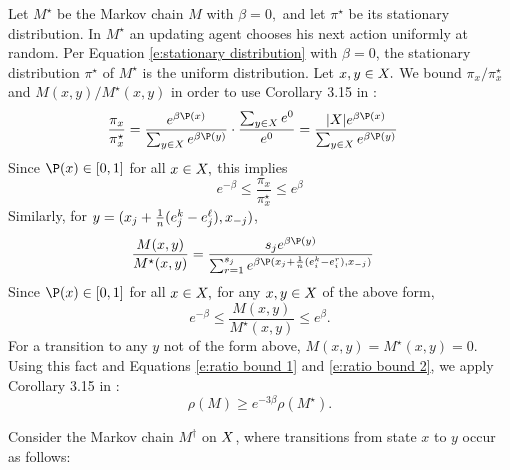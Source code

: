 \noindent{}
Let $M^\star$  be the Markov chain $M$ with $\beta = 0,$ and let $\pi^\star$ be its stationary distribution. In $M^\star$ an updating agent chooses his next action uniformly at random. Per Equation \eqref{e:stationary distribution} with $\beta=0$, the stationary distribution $\pi^\star$ of $M^\star$ is the uniform distribution.
  Let $x,y\in  X.$  We bound $\pi_x/\pi_x^\star$ and $M(x,y)/M^\star(x,y)$ in order to use Corollary 3.15 in \cite{Montenegro2006}:
\begin{align*}
\frac{\pi_{x}}{\pi_{x}^\star} &= \frac{e^{\beta\P(x)}}{\sum_{y\in  \sX} e^{\beta\P(y)}}\cdot\frac{\sum_{y\in  \sX} e^0}{e^0}=\frac{| \sX|e^{\beta\P(x)}}{\sum_{y\in  \sX} e^{\beta\P(y)}}
\end{align*}
Since $\P(x)\in [0,1]$ for all $ x\in  X,$ this implies
\begin{equation}\label{e:ratio bound 1}
e^{-\beta}\leq\frac{\pi_{x}}{\pi_{x}^\star}\leq e^\beta
\end{equation}
Similarly, for $y = (x_{j}+\frac{1}{n}(e_j^k - e_j^{\ell}),x_{-j})$,
\begin{align*}
\frac{M(x,y)}{M^\star(x,y)} &= 
 \frac{s_je^{\beta\P(y)}}{\sum_{r = 1}^{s_j}e^{\beta\P(\bx_{j} + \frac{1}{n}(e^k _i- e^r_i),\bx_{-j})}}
\end{align*}
Since $\P(x)\in [0,1]$ for all $ x\in X,$
  for any $x,y\in X$ of the above form,
\begin{equation}\label{e:ratio bound 2}
e^{-\beta}\leq \frac{M(x,y)}{M^\star(x,y)}\leq e^\beta.
\end{equation}
For a transition to any $y$ not of the form above, $M(x,y) = M^\star(x,y) = 0.$  Using this fact and Equations \eqref{e:ratio bound 1} and \eqref{e:ratio bound 2}, we apply Corollary 3.15 in \cite{Montenegro2006}: %
\begin{equation}\label{Sob const ineq 1}\rho(M)\geq e^{-3\beta}\rho(M^\star).\end{equation}


\noindent{}
Consider the Markov chain $M^\dag$ on $ X $, where transitions from state $x$ to $y$ occur as follows:

